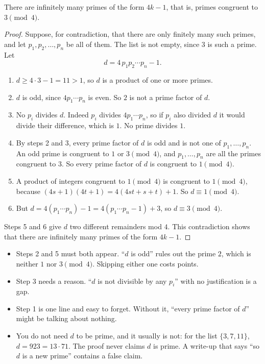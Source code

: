\documentclass[11pt]{article}
\begin{document}
\begin{claim}
There are infinitely many primes of the form $4k - 1$, that is, primes congruent to $3 \pmod 4$.
\end{claim}
\begin{proof}
Suppose, for contradiction, that there are only finitely many such primes, and let $p_1, p_2, \dots, p_n$ be all of them. The list is not empty, since $3$ is such a prime. Let
\[ d = 4\,p_1 p_2 \cdots p_n - 1. \]
\begin{enumerate}
  \item $d \ge 4 \cdot 3 - 1 = 11 > 1$, so $d$ is a product of one or more primes.
  \item $d$ is odd, since $4 p_1 \cdots p_n$ is even. So $2$ is not a prime factor of $d$.
  \item No $p_i$ divides $d$. Indeed $p_i$ divides $4 p_1 \cdots p_n$, so if $p_i$ also divided $d$ it would divide their difference, which is $1$. No prime divides $1$.
  \item By steps 2 and 3, every prime factor of $d$ is odd and is not one of $p_1, \dots, p_n$. An odd prime is congruent to $1$ or $3 \pmod 4$, and $p_1, \dots, p_n$ are all the primes congruent to $3$. So every prime factor of $d$ is congruent to $1 \pmod 4$.
  \item A product of integers congruent to $1 \pmod 4$ is congruent to $1 \pmod 4$, because $(4s+1)(4t+1) = 4(4st + s + t) + 1$. So $d \equiv 1 \pmod 4$.
  \item But $d = 4(p_1 \cdots p_n) - 1 = 4(p_1 \cdots p_n - 1) + 3$, so $d \equiv 3 \pmod 4$.
\end{enumerate}
Steps 5 and 6 give $d$ two different remainders mod $4$. This contradiction shows that there are infinitely many primes of the form $4k - 1$.
\end{proof}

\begin{gradingnote}\leavevmode
\begin{itemize}
  \item Steps 2 and 5 must both appear. ``$d$ is odd'' rules out the prime $2$, which is neither $1$ nor $3 \pmod 4$. Skipping either one costs points.
  \item Step 3 needs a reason. ``$d$ is not divisible by any $p_i$'' with no justification is a gap.
  \item Step 1 is one line and easy to forget. Without it, ``every prime factor of $d$'' might be talking about nothing.
  \item You do not need $d$ to be prime, and it usually is not: for the list $\{3, 7, 11\}$, $d = 923 = 13 \cdot 71$. The proof never claims $d$ is prime. A write-up that says ``so $d$ is a new prime'' contains a false claim.
\end{itemize}
\end{gradingnote}
\end{document}
